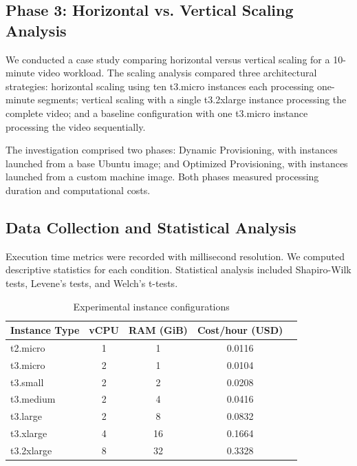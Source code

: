 \documentclass[conference]{IEEEtran}
\begin{document}
	\subsection{Phase 3: Horizontal vs. Vertical Scaling Analysis}
	
	We conducted a case study comparing horizontal versus vertical scaling for a 10-minute video workload. The scaling analysis compared three architectural strategies: horizontal scaling using ten t3.micro instances each processing one-minute segments; vertical scaling with a single t3.2xlarge instance processing the complete video; and a baseline configuration with one t3.micro instance processing the video sequentially.
	
	The investigation comprised two phases: Dynamic Provisioning, with instances launched from a base Ubuntu image; and Optimized Provisioning, with instances launched from a custom machine image. Both phases measured processing duration and computational costs.
	
	\subsection{Data Collection and Statistical Analysis}
	\label{data-collection-and-storage}
	
	Execution time metrics were recorded with millisecond resolution. We computed descriptive statistics for each condition. Statistical analysis included Shapiro-Wilk tests, Levene's tests, and Welch's t-tests.
	
	\begin{table}[H]
		\centering
		\caption{Experimental instance configurations}
		\label{tab:experimental_configurations}
		\begin{tabular}{|l|c|c|c|c|}
			\hline
			\textbf{Instance Type} & \textbf{vCPU} & \textbf{RAM (GiB)} & \textbf{Cost/hour (USD)}  \\
			\hline
			t2.micro & 1 & 1 & 0.0116  \\
			t3.micro & 2 & 1 & 0.0104 \\
			t3.small & 2 & 2 & 0.0208 \\
			t3.medium & 2 & 4 & 0.0416 \\
			t3.large & 2 & 8 & 0.0832 \\
			t3.xlarge & 4 & 16 & 0.1664 \\
			t3.2xlarge & 8 & 32 & 0.3328 \\
			\hline
		\end{tabular}
	\end{table}
	
\end{document}
